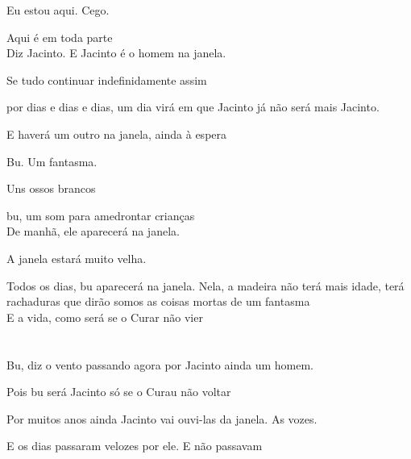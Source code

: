 Eu estou aqui. Cego.

Aqui é em toda parte\\

Diz Jacinto. E Jacinto é o homem na janela.

\pagebreak

\clearpage
\thispagestyle{empty}

\movetooddpage

\vspace*{4cm}

Se tudo continuar indefinidamente assim

por dias e dias e dias, um dia virá em que Jacinto já não será mais
Jacinto.

E haverá um outro na janela, ainda à espera

Bu. Um fantasma.

Uns ossos brancos

bu, um som para amedrontar crianças\\

De manhã, ele aparecerá na janela.

A janela estará muito velha.

Todos os dias, bu aparecerá na janela. Nela, a madeira não terá mais
idade, terá rachaduras que dirão somos as coisas mortas de um fantasma\\

E a vida, como será se o Curar não vier

\pagebreak
\pagecolor{black}

\chapter*{}
\pagecolor{black}\afterpage{\nopagecolor}


\movetoevenpage

\vspace*{4cm}

Bu, diz o vento passando agora por Jacinto ainda um homem.

Pois bu será Jacinto só se o Curau não voltar

\pagebreak

\vspace*{4cm}

Por muitos anos ainda Jacinto vai ouvi-las da janela. As vozes.

E os dias passaram velozes por ele. E não passavam

\pagebreak
\clearpage
\thispagestyle{empty}

\movetooddpage

